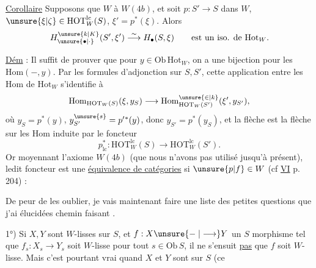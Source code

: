 \uline{Corollaire} Supposons que $W$  à $W(4b)$, et soit $p:S'\longrightarrow S$ dans $W$, $\unsure{\xi|\zeta}\in\mathrm{HOT}_W^{\mathrm{lc}}(S)$, $\xi'=p^*(\xi)$. Alors
\[
H_{\unsure{\bullet|\cdot}}^{\unsure{k|K}}(S',\xi')\overset{\sim}{\longrightarrow}H_{\bullet}(S,\xi)\qquad\text{est un iso. de }\mathrm{Hot}_W.
\]

\uline{Dém} : Il suffit de prouver que pour  $y\in\mathrm{Ob}\,\mathrm{Hot}_W$, on a une bijection pour les $\mathrm{Hom}(-,y)$. Par les formules d'adjonction sur $S,S'$, cette application entre les $\mathrm{Hom}$ de $\mathrm{Hot}_W$ s'identifie à
\[
\mathrm{Hom}_{\mathrm{HOT}_W(S)}(\xi,y_S)\longrightarrow\mathrm{Hom}_{\mathrm{HOT}_W(S')}^{\unsure{\in|k}}(\xi',y_{S'}),
\]
où $y_S=p^*(y)$, $y_{S'}^{\unsure{s}}=p'{}^*(y)$, donc $y_{S'}=p^*(y_S)$, et la flèche \unsure{(**)} est la flèche sur les $\mathrm{Hom}$ induite par le foncteur
\[
p_{\mathrm{lc}}^*:\mathrm{HOT}_W^{\mathrm{lc}}(S)\longrightarrow\mathrm{HOT}_W^{\mathrm{lc}}(S').
\]
Or moyennant l'axiome $W(4b)$\unsure{,} (que nous n'avons pas utilisé jusqu'à présent), ledit foncteur est une \uline{équivalence de catégories} si $\unsure{p|f}\in W$ (cf \uline{VI} p. 204) : 

De peur de les oublier, je vais maintenant faire une liste des petites questions que j'ai élucidées chemin faisant .

1°) Si $X,Y$ sont $W$-lisses sur $S$, et $f:X\unsure{\relbar|\longrightarrow}Y$ un $S$ morphisme tel que $f_s:X_s\longrightarrow Y_s$ soit $W$-lisse pour tout $s\in\mathrm{Ob}\,S$, il ne s'ensuit \uline{pas} que $f$ soit $W$-lisse. Mais c'est pourtant vrai quand $X$ et $Y$ sont   sur $S$ (ce
